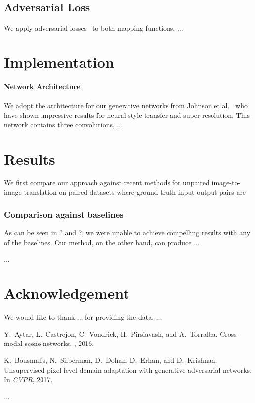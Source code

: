 \documentclass[10pt,twocolumn,letterpaper]{article}
\newcommand{\shortcite}[1]{\cite{#1}}
\begin{document}
\subsection{Adversarial Loss}
We apply adversarial losses~\cite{goodfellow2014generative} to both mapping functions.  
...


\section{Implementation}
 

\paragraph{Network Architecture}
We adopt the architecture for our generative networks from Johnson et al.~\shortcite{johnson2016perceptual} who have shown impressive results for neural style transfer and super-resolution. This network contains three convolutions,  
...


\section{Results}
 
We first compare our approach against recent methods for unpaired image-to-image translation on paired datasets where ground truth input-output pairs are  
 

\subsubsection{Comparison against baselines}
As can be seen in  ? and  ?, we were unable to achieve compelling results with any of the baselines. Our method, on the other hand, can produce ...

 
...
 
 \section{Acknowledgement}
We would like to thank ... for providing the data. ...
 
 
 



\begin{thebibliography}{10}\itemsep=-1pt

Y.~Aytar, L.~Castrejon, C.~Vondrick, H.~Pirsiavash, and A.~Torralba.
\newblock Cross-modal scene networks.
, 2016.

K.~Bousmalis, N.~Silberman, D.~Dohan, D.~Erhan, and D.~Krishnan.
\newblock Unsupervised pixel-level domain adaptation with generative
  adversarial networks.
\newblock In {\em CVPR}, 2017.


...

\end{thebibliography}
\end{document}
